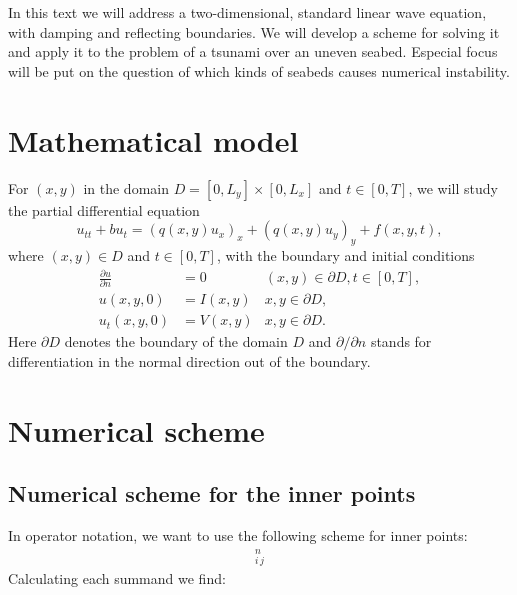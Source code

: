 \documentclass[twoside]{article}
\begin{document}
\label{Introduction}
In this text we will address a two-dimensional, standard linear wave equation, with damping and reflecting boundaries. We will develop a scheme for solving it and apply it to the problem of a tsunami over an uneven seabed. Especial focus will be put on the question of which kinds of seabeds causes numerical instability. 

\section{Mathematical model}

\label{Model}
For $(x, y)$ in the domain $D = [0,L_y] \times [0,L_x]$ and $t \in [0,T]$, we will study the partial differential equation
\begin{equation}
u_{tt} + b u_{t} = (q(x, y)u_{x})_{x} + (q(x, y)u_{y})_{y} + f(x, y, t), 
\end{equation}
where $(x, y) \in D$ and $t \in [0, T]$, with the boundary and initial conditions
\begin{align}
\frac{\partial u}{\partial n} &= 0 & (x, y) \in \partial D,  t \in [0, T], \nonumber \\
u(x, y, 0) &= I(x, y) &x,y \in \partial D, \nonumber \\
u_{t}(x, y, 0) &= V(x, y) &x,y \in \partial D.
\end{align} 
Here $\partial D$ denotes the boundary of the domain $D$ and $\partial /\partial n$ stands for differentiation in the normal direction out of the boundary.

\section{Numerical scheme}

\label{Scheme}
\subsection{Numerical scheme for the inner points}
In operator notation, we want to use the following scheme for inner points:
\begin{align}
[D_{t} D_{t} u + b D_{2t} u = D_{x}(q D_{x} u) + D_{y} (q D_{y} u) +f]_{i\, j}^{n} \label{PDE}
\end{align}
Calculating each summand we find:
\end{document}
